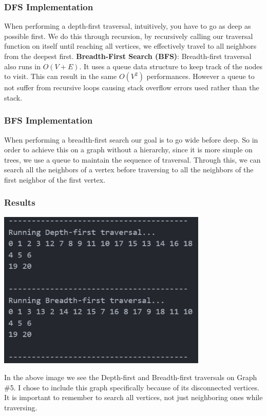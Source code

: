 \documentclass[12pt, letterpaper]{article}
\begin{document}
\subsubsection{DFS Implementation}
\begin{center}
   
\end{center}
When performing a depth-first traversal, intuitively, you have to go as deep as possible first.
We do this through recursion, by recursively calling our traversal function on itself until reaching all vertices, we effectively travel to all neighbors from the deepest first.
\vspace*{5px}
\newline
\textbf{Breadth-First Search (BFS)}:
\newline
Breadth-first traversal also runs in $O(V + E)$.
It uses a queue data structure to keep track of the nodes to visit.
This can result in the same $O(V^2)$ performances. 
However a queue to not suffer from recursive loops causing stack overflow errors used rather than the stack.
\subsubsection{BFS Implementation}
\begin{center}
   
\end{center}
When performing a breadth-first search our goal is to go wide before deep.
So in order to achieve this on a graph without a hierarchy, since it is more simple on trees, we use a queue to maintain the sequence of traversal.
Through this, we can search all the neighbors of a vertex before traversing to all the neighbors of the first neighbor of the first vertex.
\subsubsection{Results}
\begin{center}
   \includegraphics[width=100mm, scale=0.5]{Images/Graph5_Traversals.png}
\end{center}
In the above image we see the Depth-first and Breadth-first traversals on Graph \#5.
I chose to include this graph specifically because of its disconnected vertices.
It is important to remember to search all vertices, not just neighboring ones while traversing.
\end{document}
